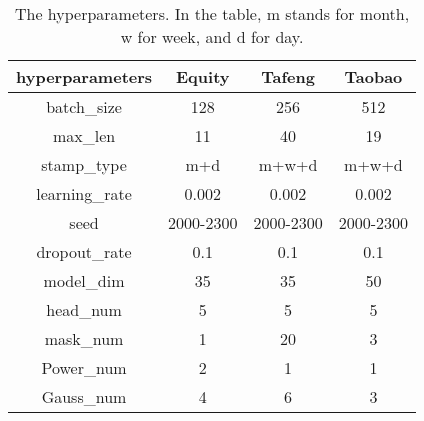 
\begin{table}[htbp]
    \label{hyperparameters}
    \caption{The hyperparameters. In the table, m stands for month, w for week, and d for day.}
    \footnotesize
    \centering
    \begin{tabular}{c c c c}
    \hline
    hyperparameters & Equity & Tafeng & Taobao \\
    \hline
    batch\_size        & 128           & 256             & 512              \\
    max\_len           & 11            & 40              & 19               \\
    stamp\_type        & m+d     & m+w+d  & m+w+d   \\
    learning\_rate     & 0.002         & 0.002           & 0.002            \\
    seed               & 2000-2300     & 2000-2300       & 2000-2300        \\
    dropout\_rate      & 0.1           & 0.1             & 0.1              \\
    model\_dim         & 35            & 35              & 50               \\
    head\_num          & 5             & 5               & 5                \\
    mask\_num          & 1             & 20              & 3                \\
    Power\_num         & 2             & 1               & 1                \\
    Gauss\_num         & 4             & 6               & 3                \\
    \hline
    \end{tabular}
    \label{hyperpara}
\end{table}